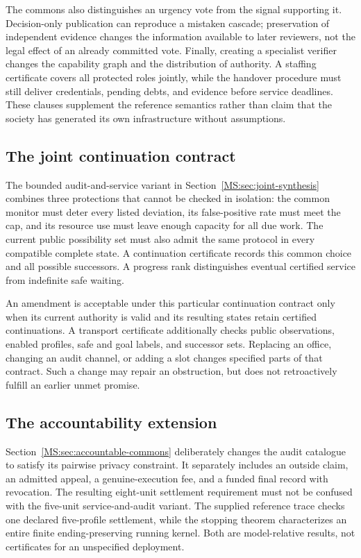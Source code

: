 \documentclass[11pt,oneside,openany]{book}
\numberwithin{equation}{section}
\begin{document}
The commons also distinguishes an urgency vote from the signal supporting it. Decision-only publication can reproduce a mistaken cascade; preservation of independent evidence changes the information available to later reviewers, not the legal effect of an already committed vote. Finally, creating a specialist verifier changes the capability graph and the distribution of authority. A staffing certificate covers all protected roles jointly, while the handover procedure must still deliver credentials, pending debts, and evidence before service deadlines. These clauses supplement the reference semantics rather than claim that the society has generated its own infrastructure without assumptions.

\subsection{The joint continuation contract}
The bounded audit-and-service variant in Section~\ref{MS:sec:joint-synthesis} combines three protections that cannot be checked in isolation: the common monitor must deter every listed deviation, its false-positive rate must meet the cap, and its resource use must leave enough capacity for all due work. The current public possibility set must also admit the same protocol in every compatible complete state. A continuation certificate records this common choice and all possible successors. A progress rank distinguishes eventual certified service from indefinite safe waiting.

An amendment is acceptable under this particular continuation contract only when its current authority is valid and its resulting states retain certified continuations. A transport certificate additionally checks public observations, enabled profiles, safe and goal labels, and successor sets. Replacing an office, changing an audit channel, or adding a slot changes specified parts of that contract. Such a change may repair an obstruction, but does not retroactively fulfill an earlier unmet promise.
\FloatBarrier

\subsection{The accountability extension}
Section~\ref{MS:sec:accountable-commons} deliberately changes the audit catalogue to satisfy its pairwise privacy constraint. It separately includes an outside claim, an admitted appeal, a genuine-execution fee, and a funded final record with revocation. The resulting eight-unit settlement requirement must not be confused with the five-unit service-and-audit variant. The supplied reference trace checks one declared five-profile settlement, while the stopping theorem characterizes an entire finite ending-preserving running kernel. Both are model-relative results, not certificates for an unspecified deployment.
\end{document}
